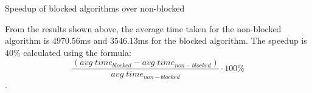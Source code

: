 \documentclass[12pt]{article}
\begin{document}
\begin{section}{Speedup of blocked algorithms over non-blocked}

 From the results shown above, the average time taken for the non-blocked algorithm is $4970.56$ms and $3546.13$ms for the blocked algorithm.
 The speedup is $40\%$ calculated using the formula: $$\frac{(avg\;time_{blocked} - avg\;time_{non-blocked})}{avg\;time_{non-blocked}} \cdot 100\%$$.
\end{section}
\end{document}
